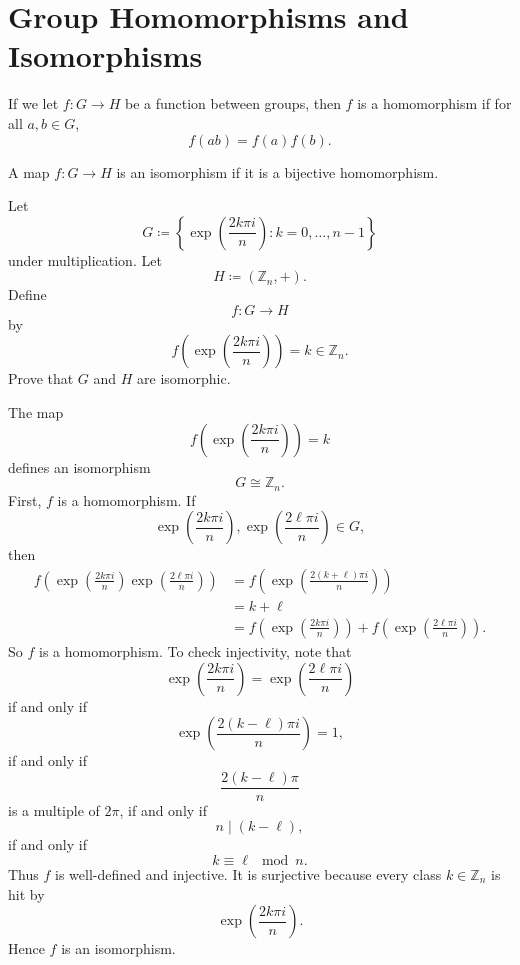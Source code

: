 
\section{Group Homomorphisms and Isomorphisms}

\begin{definition}
    If we let $f:G\to H$ be a function between groups, then $f$ is a homomorphism if for all $a,b\in G$,
    \[
        f(ab)=f(a)f(b).
    \]
\end{definition}

\begin{definition}
    A map $f:G\to H$ is an isomorphism if it is a bijective homomorphism.
\end{definition}

\begin{example}
    Let
    \[
        G\coloneqq \left\{\exp\left(\frac{2k\pi i}{n}\right):k=0,\dots,n-1\right\}
    \]
    under multiplication.
    Let
    \[
        H\coloneqq (\mathbb{Z}_n,+).
    \]
    Define
    \[
        f:G\to H
    \]
    by
    \[
        f\left(\exp\left(\frac{2k\pi i}{n}\right)\right)=k\in\mathbb{Z}_n.
    \]
    Prove that $G$ and $H$ are isomorphic.
\end{example}

\begin{proposition}{
    The map
    \[
        f\left(\exp\left(\frac{2k\pi i}{n}\right)\right)=k
    \]
    defines an isomorphism
    \[
        G\cong \mathbb{Z}_n.
    \]
}
    First, $f$ is a homomorphism.
    If
    \[
        \exp\left(\frac{2k\pi i}{n}\right),\exp\left(\frac{2\ell\pi i}{n}\right)\in G,
    \]
    then
    \begin{align*}
        f\left(\exp\left(\frac{2k\pi i}{n}\right)\exp\left(\frac{2\ell\pi i}{n}\right)\right)
        &=
        f\left(\exp\left(\frac{2(k+\ell)\pi i}{n}\right)\right)\\
        &=
        k+\ell\\
        &=
        f\left(\exp\left(\frac{2k\pi i}{n}\right)\right)+
        f\left(\exp\left(\frac{2\ell\pi i}{n}\right)\right).
    \end{align*}
    So $f$ is a homomorphism.
    To check injectivity, note that
    \[
        \exp\left(\frac{2k\pi i}{n}\right)=\exp\left(\frac{2\ell\pi i}{n}\right)
    \]
    if and only if
    \[
        \exp\left(\frac{2(k-\ell)\pi i}{n}\right)=1,
    \]
    if and only if
    \[
        \frac{2(k-\ell)\pi}{n}
    \]
    is a multiple of $2\pi$,
    if and only if
    \[
        n\mid (k-\ell),
    \]
    if and only if
    \[
        k\equiv \ell \mod n.
    \]
    Thus $f$ is well-defined and injective.
    It is surjective because every class $k\in\mathbb{Z}_n$ is hit by
    \[
        \exp\left(\frac{2k\pi i}{n}\right).
    \]
    Hence $f$ is an isomorphism.
\end{proposition}

